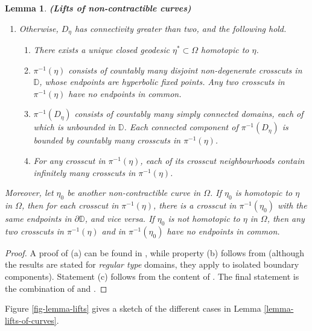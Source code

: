 \documentclass[11pt,a4paper,reqno]{amsart}
\theoremstyle{plain}
\newtheorem{lemma}[thm]{Lemma}
\theoremstyle{definition}
\theoremstyle{plain}
\begin{document}
\begin{lemma}{\bf (Lifts of non-contractible curves)}
\begin{enumerate}[label={\em (\alph*)}]
\begin{enumerate}[label={\em b.\arabic*}]
		\end{enumerate}
		\item Otherwise, $ D_\eta $ has connectivity greater than two, and the following hold.
				\begin{enumerate}[label={\em c.\arabic*}]
			\item There exists a unique closed geodesic $\eta^*\subset\Omega$ homotopic to $\eta$.
			\item $ \pi^{-1}(\eta) $ consists of  countably many disjoint non-degenerate crosscuts in $ \mathbb{D} $, whose endpoints are hyperbolic fixed points. Any two crosscuts in $ \pi^{-1}(\eta) $ have no endpoints in common.
			\item $ \pi^{-1}(D_\eta) $ consists of countably many simply connected domains, each of which is unbounded in $ \mathbb{D} $. Each connected component of $ \pi^{-1}(D_\eta) $ is bounded by countably many crosscuts in $ \pi^{-1}(\eta) $.
			\item For any crosscut in $ \pi^{-1}(\eta) $, each of its crosscut neighbourhoods contain infinitely many crosscuts in $ \pi^{-1}(\eta) $.
		\end{enumerate}
	\end{enumerate}

\noindent Moreover, let $ \eta_0 $ be another non-contractible curve in $ \Omega $. If $ \eta_0 $ is homotopic to $ \eta $ in $ \Omega $,  then for each crosscut in $ \pi^{-1}(\eta) $, there is a crosscut in $ \pi^{-1}(\eta_0) $  with the same endpoints in $ \partial\mathbb{D} $, and vice versa. If $ \eta_0 $ is not homotopic to $ \eta $ in $ \Omega $, then any two crosscuts in $ \pi^{-1}(\eta) $ and in $ \pi^{-1}(\eta_0) $ have no endpoints in common.
\end{lemma}

\begin{proof}
A proof of (a) can be found in \cite[Thm. 1.8.7]{Aba23}, while property (b) follows from \cite[Thm. 1.8.9]{Aba23} (although the results are stated for {\em regular type} domains, they apply to isolated boundary components). Statement (c) follows from the content of  \cite[Sect. 3]{Oht54}. The final statement  is the combination of \cite[Lemma 1]{Oht54} and \cite[Lemma 1.6.5]{Bus92}.
\end{proof}

Figure \ref{fig-lemma-lifts} gives a sketch of the different cases in Lemma \ref{lemma-lifts-of-curves}.
\end{document}
